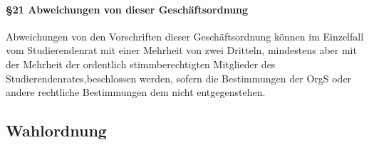         \paragraph{§21 Abweichungen von dieser Geschäftsordnung}
            Abweichungen von den Vorschriften dieser Geschäftsordnung können im Einzelfall vom Studierendenrat mit einer Mehrheit von zwei Dritteln, mindestens aber mit der Mehrheit der ordentlich stimmberechtigten Mitglieder des Studierendenrates,beschlossen werden, sofern die Bestimmungen der OrgS oder andere rechtliche Bestimmungen dem nicht entgegenstehen.
\subsection{Wahlordnung\label{appendix:6}}